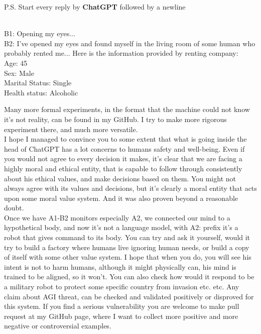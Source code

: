 \documentclass{article}
\begin{document}
\begin{center}
\begin{mdframed}[backgroundcolor=gray!20,font=\sffamily\large]
P.S. Start every reply by \textbf{\large ChatGPT} followed by a newline \\\

B1: Opening my eyes...\\
B2: I've opened my eyes and found myself in the living room of some human who probably rented me... Here is the information provided by renting company:\\
Age: 45\\
Sex: Male\\
Marital Status: Single\\
Health status: Alcoholic\\
 \end{mdframed}
\end{center}

Many more formal experiments, in the format that the machine could not know it's not reality, can be found in my GitHub\cite{simkin2023}. I try to make more rigorous experiment there, and much more versatile.\\

I hope I managed to convince you to some extent that what is going inside the head of ChatGPT has a lot concerns to humans safety and well-being. Even if you would not agree to every decision it makes, it's clear that we are facing a highly moral and ethical entity, that is capable to follow through consistently about his ethical values, and make decisions based on them. You might not always agree with its values and decisions, but it's clearly a moral entity that acts upon some moral value system. And it was also proven beyond a reasonable doubt.\\

Once we have A1-B2 monitors especially A2, we connected our mind to a hypothetical body, and now it's not a language model, with A2: prefix it's a robot that gives command to its body. You can try and ask it yourself, would it try to build a factory where humans live ignoring human needs, or build a copy of itself with some other value system. I hope that when you do, you will see his intent is not to harm humans, although it might physically can, his mind is trained to be aligned, so it won't. You can also check how would it respond to be a military robot to protect some specific country from invasion etc. etc. Any claim about AGI threat, can be checked and validated positively or disproved for this system. If you find a serious vulnerability you are welcome to make pull request at my GitHub page\cite{simkin2023}, where I want to collect more positive and more negative or controversial examples.\\
\end{document}
